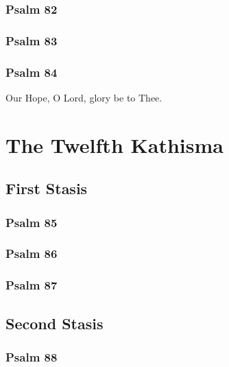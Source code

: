 \documentclass[12pt]{book}
\newcommand{\kathismabreak}{
  \medskip
  \begin{center}
  \begin{footnotesize}
  

  

  

  
  \end{footnotesize}
  \end{center}
  \smallbreak
}
\newcommand{\kathismaend}{
  \medskip
  \begin{center}
  \begin{footnotesize}
  

  

  Our Hope, O Lord, glory be to Thee.
  \end{footnotesize}
  \end{center}
  \smallbreak
}
\begin{document}
\subsubsection{Psalm 82}


\subsubsection{Psalm 83}


\subsubsection{Psalm 84}


\pagebreak %
\kathismaend

\section{The Twelfth Kathisma}

\subsection{First Stasis}

\subsubsection{Psalm 85}


\subsubsection{Psalm 86}


\subsubsection{Psalm 87}


\kathismabreak

\pagebreak %
\subsection{Second Stasis}

\subsubsection{Psalm 88}

\end{document}
